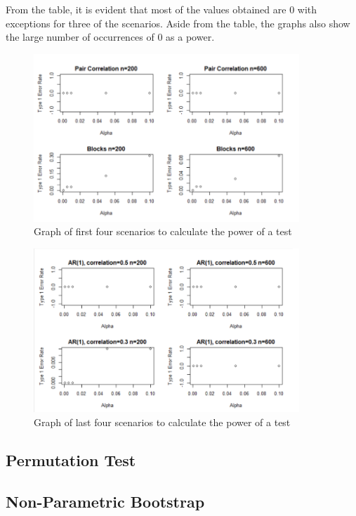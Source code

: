 \documentclass[12pt, letterpaper]{article}
\begin{document}
From the table, it is evident that most of the values obtained are 0 with exceptions for three of the scenarios.  Aside from the table, the graphs also show the large number of occurrences of 0 as a power.

\begin{figure}[!hb]
\centering
\includegraphics[width=10cm]{PowerGraphs1.png}
\caption{Graph of first four scenarios to calculate the power of a test}
\label{fig: Power Graphs 1}
\end{figure}

\begin{figure}[!hb]
\centering
\includegraphics[width=10cm]{PowerGraphs2.png}
\caption{Graph of last four scenarios to calculate the power of a test}
\label{fig: Power Graphs 2}
\end{figure}


\subsection{Permutation Test}
\subsection{Non-Parametric Bootstrap}
\end{document}
